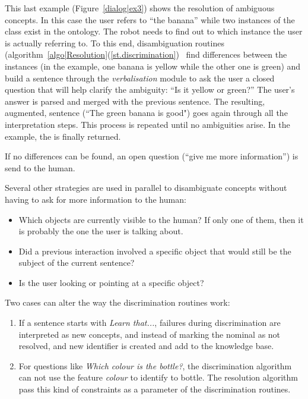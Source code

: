 This last example (Figure~\ref{dialog|ex3}) shows the resolution of ambiguous
concepts. In this case the user refers to ``the banana'' while two instances of
the  class exist in the ontology. The robot needs to find out
to which instance the user is actually referring to. To this end,
disambiguation routines
(algorithm~\ref{algo|Resolution}(\ref{st.discrimination})~\cite{Ros2010b}
 find differences between the
instances (in the example, one banana is yellow while the other one is green)
and build a sentence through the \emph{verbalisation} module to ask the user a
closed question that will help clarify the ambiguity: ``Is it yellow or
green?'' The user's answer is parsed and merged with the previous sentence. The
resulting, augmented, sentence (``The green banana is good") goes again through
all the interpretation steps. This process is repeated until no ambiguities
arise.  In the example, the  is finally returned.

If no differences  can be found, an open question 
(``give me more information'') is send to the human.

Several other strategies are used in parallel to disambiguate concepts without
having to ask for more information to the human:

\begin{itemize}
	\item Which objects are currently visible to the human? If only one of
	them, then it is probably the one the user is talking about. 
	\item Did a previous interaction involved a specific object that would
	still be the subject of the current sentence?
	\item Is the user looking or pointing at a specific object?
\end{itemize}

Two cases can alter the way the discrimination routines work:
\begin{enumerate}
    \item If a sentence starts with {\it Learn that...}, failures during 
    discrimination are interpreted as new concepts, and instead of marking the 
    nominal as not resolved, and new identifier is created and add to the knowledge base.
    \item For questions like {\it Which colour is the bottle?}, the discrimination 
    algorithm can not use the feature {\it colour} to identify to bottle. The 
    resolution algorithm pass this kind of constraints as a parameter of the 
    discrimination routines.
\end{enumerate}

